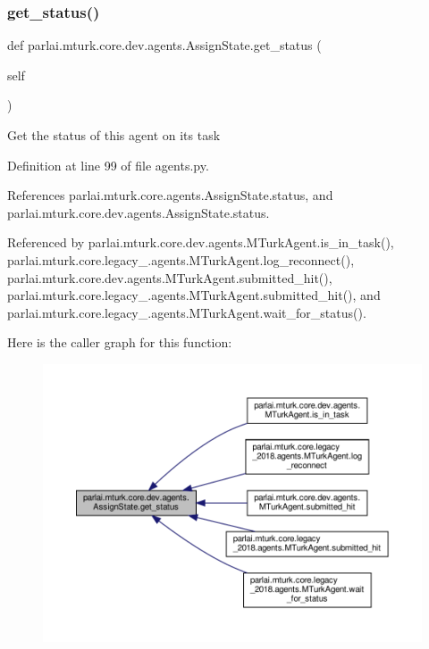 \subsubsection{\texorpdfstring{get\+\_\+status()}{get\_status()}}
{\footnotesize\ttfamily def parlai.\+mturk.\+core.\+dev.\+agents.\+Assign\+State.\+get\+\_\+status (\begin{DoxyParamCaption}\item[{}]{self }\end{DoxyParamCaption})}

\begin{DoxyVerb}Get the status of this agent on its task\end{DoxyVerb}
 

Definition at line 99 of file agents.\+py.



References parlai.\+mturk.\+core.\+agents.\+Assign\+State.\+status, and parlai.\+mturk.\+core.\+dev.\+agents.\+Assign\+State.\+status.



Referenced by parlai.\+mturk.\+core.\+dev.\+agents.\+M\+Turk\+Agent.\+is\+\_\+in\+\_\+task(), parlai.\+mturk.\+core.\+legacy\+\_.\+agents.\+M\+Turk\+Agent.\+log\+\_\+reconnect(), parlai.\+mturk.\+core.\+dev.\+agents.\+M\+Turk\+Agent.\+submitted\+\_\+hit(), parlai.\+mturk.\+core.\+legacy\+\_.\+agents.\+M\+Turk\+Agent.\+submitted\+\_\+hit(), and parlai.\+mturk.\+core.\+legacy\+\_.\+agents.\+M\+Turk\+Agent.\+wait\+\_\+for\+\_\+status().

Here is the caller graph for this function\+:
\nopagebreak
\begin{figure}[H]
\begin{center}
\leavevmode
\includegraphics[width=350pt]{classparlai_1_1mturk_1_1core_1_1dev_1_1agents_1_1AssignState_a148aa78f43e6d050c29368b8c2aaf0a6_icgraph}
\end{center}
\end{figure}
\mbox{\label{classparlai_1_1mturk_1_1core_1_1dev_1_1agents_1_1AssignState_a169e39dab458bde9c9ee494fc31fab00}} 
